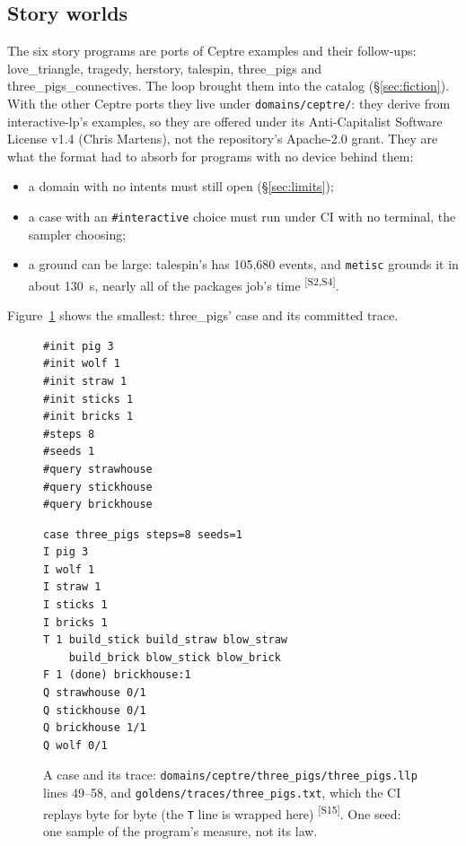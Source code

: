\documentclass[11pt]{article}
\newcommand{\metisc}{\texttt{metisc}}
\newcommand{\src}[1]{\textsuperscript{[#1]}}
\begin{document}
\subsection{Story worlds}
The six story programs are ports of Ceptre examples and their follow-ups:
love\_triangle, tragedy, herstory, talespin, three\_pigs and
three\_pigs\_connectives. The loop brought them into the catalog
(\S\ref{sec:fiction}). With the other Ceptre ports they live under
\texttt{domains/ceptre/}: they derive from interactive-lp's examples, so
they are offered under its Anti-Capitalist Software License v1.4 (Chris
Martens), not the repository's Apache-2.0 grant. They are what the format had to absorb for
programs with no device behind them:
\begin{itemize}[nosep]
\item a domain with no intents must still open (\S\ref{sec:limits});
\item a case with an \texttt{\#interactive} choice must run under CI with
  no terminal, the sampler choosing;
\item a ground can be large: talespin's has 105{,}680 events, and \metisc{}
  grounds it in about 130~s, nearly all of the packages job's time
  \src{S2,S4}.
\end{itemize}
Figure~\ref{fig:case} shows the smallest: three\_pigs' case and its
committed trace.

\begin{figure}[t]
\begin{minipage}[t]{0.40\textwidth}
\begin{Verbatim}[fontsize=\small,frame=single]
#init pig 3
#init wolf 1
#init straw 1
#init sticks 1
#init bricks 1
#steps 8
#seeds 1
#query strawhouse
#query stickhouse
#query brickhouse
\end{Verbatim}
\end{minipage}\hfill
\begin{minipage}[t]{0.57\textwidth}
\begin{Verbatim}[fontsize=\small,frame=single]
case three_pigs steps=8 seeds=1
I pig 3
I wolf 1
I straw 1
I sticks 1
I bricks 1
T 1 build_stick build_straw blow_straw
    build_brick blow_stick blow_brick
F 1 (done) brickhouse:1
Q strawhouse 0/1
Q stickhouse 0/1
Q brickhouse 1/1
Q wolf 0/1
\end{Verbatim}
\end{minipage}
\caption{A case and its trace: \texttt{domains/ceptre/three\_pigs/three\_pigs.llp}
lines 49--58, and \texttt{goldens/traces/three\_pigs.txt}, which the CI
replays byte for byte (the \texttt{T} line is wrapped here) \src{S15}. One
seed: one sample of the program's measure, not its law.}
\label{fig:case}
\end{figure}
\end{document}
